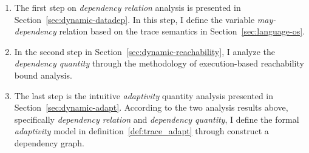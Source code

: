  \begin{enumerate}
 \item The first step on \emph{dependency relation} analysis is presented in 
 Section~\ref{sec:dynamic-datadep}.
 In this step, I define the variable \emph{may-dependency} relation based on the trace semantics in Section~\ref{sec:language-os}.
 \item In the second step in Section~\ref{sec:dynamic-reachability}, I analyze the \emph{dependency quantity} through the methodology of execution-based reachability bound analysis.
 \item The last step is the intuitive \emph{adaptivity} quantity analysis presented in Section~\ref{sec:dynamic-adapt}.
 According to the two analysis results above, specifically \emph{dependency relation} and \emph{dependency quantity},
 I define the formal \emph{adaptivity} model in definition~\ref{def:trace_adapt} through 
 construct a dependency graph.
 \end{enumerate}